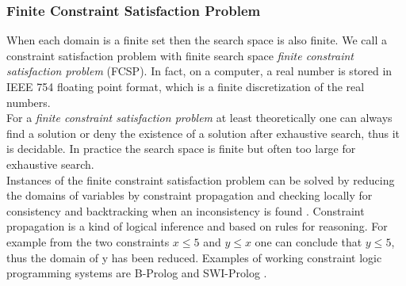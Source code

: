 \subsubsection{Finite Constraint Satisfaction Problem}
When each domain is a finite set then the search space is also finite. We call a constraint satisfaction problem with finite search space \emph{finite constraint satisfaction problem} (FCSP). In fact, on a computer, a real number is stored in IEEE 754 floating point format, which is a finite discretization of the real numbers.\\
For a \emph{finite constraint satisfaction problem} at least theoretically one can always find a solution or deny the existence of a solution after exhaustive search, thus it is decidable. In practice the search space is finite but often too large for exhaustive search.\\
Instances of the finite constraint satisfaction problem can be solved by reducing the domains of variables by constraint propagation and checking locally for consistency and backtracking when an inconsistency is found \cite{ConstraintPropagation}. Constraint propagation is a kind of logical inference and based on rules for reasoning. For example from the two constraints $x\leq 5$ and $y \leq x$ one can conclude that $y\leq 5$, thus the domain of y has been reduced. Examples of working constraint logic programming systems are B-Prolog and SWI-Prolog \cite{wielemaker2011SWIProlog}.
